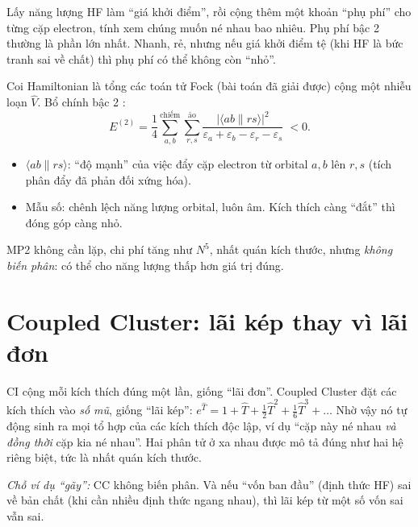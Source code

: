 \begin{eli5}
Lấy năng lượng HF làm ``giá khởi điểm'', rồi cộng thêm một khoản ``phụ phí'' cho từng cặp electron, tính xem chúng muốn né nhau bao nhiêu. Phụ phí bậc 2 thường là phần lớn nhất. Nhanh, rẻ, nhưng nếu giá khởi điểm tệ (khi HF là bức tranh sai về chất) thì phụ phí có thể không còn ``nhỏ''.
\end{eli5}

\begin{congthuc}[MP2]
Coi Hamiltonian là tổng các toán tử Fock (bài toán đã giải được) cộng một nhiễu loạn $\hat V$. Bổ chính bậc 2 \cite{MollerPlesset1934}:
\[
E^{(2)}=\frac14\sum_{a,b}^{\text{chiếm}}\sum_{r,s}^{\text{ảo}}\frac{|\langle ab\|rs\rangle|^2}{\varepsilon_a+\varepsilon_b-\varepsilon_r-\varepsilon_s}\;<0 .
\]
\begin{itemize}
\item $\langle ab\|rs\rangle$: ``độ mạnh'' của việc đẩy cặp electron từ orbital $a,b$ lên $r,s$ (tích phân đẩy đã phản đối xứng hóa).
\item Mẫu số: chênh lệch năng lượng orbital, luôn âm. Kích thích càng ``đắt'' thì đóng góp càng nhỏ.
\end{itemize}
MP2 không cần lặp, chi phí tăng như $N^5$, nhất quán kích thước, nhưng \emph{không biến phân}: có thể cho năng lượng thấp hơn giá trị đúng.
\end{congthuc}

\section{Coupled Cluster: lãi kép thay vì lãi đơn}

\begin{eli5}
CI cộng mỗi kích thích đúng một lần, giống ``lãi đơn''. Coupled Cluster đặt các kích thích vào \emph{số mũ}, giống ``lãi kép'': $e^{\hat T}=1+\hat T+\tfrac12\hat T^2+\tfrac16\hat T^3+\ldots$ Nhờ vậy nó tự động sinh ra mọi tổ hợp của các kích thích độc lập, ví dụ ``cặp này né nhau \emph{và đồng thời} cặp kia né nhau''. Hai phân tử ở xa nhau được mô tả đúng như hai hệ riêng biệt, tức là nhất quán kích thước.

\emph{Chỗ ví dụ ``gãy'':} CC không biến phân. Và nếu ``vốn ban đầu'' (định thức HF) sai về bản chất (khi cần nhiều định thức ngang nhau), thì lãi kép từ một số vốn sai vẫn sai.
\end{eli5}

